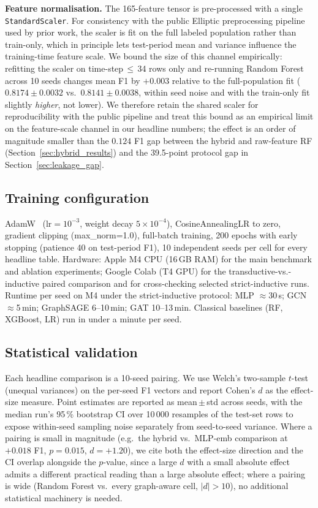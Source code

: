 \textbf{Feature normalisation.}  The 165-feature tensor is
pre-processed with a single \texttt{StandardScaler}.  For
consistency with the public Elliptic preprocessing pipeline used
by prior work, the scaler is fit on the full labeled population
rather than train-only, which in principle lets test-period mean
and variance influence the training-time feature scale.  We
bound the size of this channel empirically: refitting the scaler
on time-step\,$\le$\,34 rows only and re-running Random Forest
across 10 seeds changes mean F1 by $+0.003$ relative to the
full-population fit ($0.8174 \pm 0.0032$ vs.\ $0.8141 \pm 0.0038$,
within seed noise and with the train-only fit slightly
\emph{higher}, not lower).  We therefore retain the shared
scaler for reproducibility with the public pipeline and treat
this bound as an empirical limit on the feature-scale channel
in our headline numbers; the effect is an order of magnitude
smaller than the $0.124$ F1 gap between the hybrid and
raw-feature RF (Section~\ref{sec:hybrid_results}) and the
39.5-point protocol gap in
Section~\ref{sec:leakage_gap}.

\subsection{Training configuration}

\begin{sloppypar}
AdamW~\citep{loshchilov2019adamw} ($\text{lr}=10^{-3}$, weight decay
$5{\times}10^{-4}$), CosineAnnealingLR to zero, gradient clipping
(max\_norm=1.0), full-batch training, 200 epochs with early stopping
(patience 40 on test-period F1), 10 independent seeds per cell for
every headline table.  Hardware: Apple M4 CPU (16\,GB RAM) for the
main benchmark and ablation experiments; Google Colab (T4 GPU) for
the transductive-vs.-inductive paired comparison and for
cross-checking selected strict-inductive runs.  Runtime per seed on
M4 under the strict-inductive protocol: MLP ${\approx}$30\,s; GCN
${\approx}$5\,min; GraphSAGE 6--10\,min; GAT 10--13\,min.  Classical
baselines (RF, XGBoost, LR) run in under a minute per seed.
\end{sloppypar}

\subsection{Statistical validation}

Each headline comparison is a 10-seed pairing.  We use Welch's
two-sample $t$-test (unequal variances) on the per-seed F1 vectors
and report Cohen's $d$ as the effect-size measure.  Point estimates
are reported as mean\,$\pm$\,std across seeds, with the median run's
95\,\% bootstrap CI over 10\,000 resamples of the test-set rows to
expose within-seed sampling noise separately from seed-to-seed
variance.  Where a pairing is small in magnitude (e.g.\ the hybrid
vs.\ MLP-emb comparison at $+0.018$ F1, $p = 0.015$, $d = +1.20$),
we cite both the effect-size direction and the CI overlap alongside
the $p$-value, since a large $d$ with a small absolute effect admits
a different practical reading than a large absolute effect; where a
pairing is wide (Random Forest vs.\ every graph-aware cell,
$|d| > 10$), no additional statistical machinery is needed.

